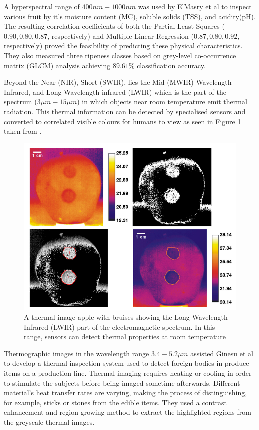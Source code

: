 \documentclass[fleqn,twoside,12pt]{report}
\begin{document}
A hyperspectral range of $400nm-1000nm$ was used by ElMasry et al \cite{elmasry2} to inspect various fruit by it's moisture content (MC), soluble solids (TSS), and acidity(pH). The resulting correlation coefficients of both the Partial Least Squares ($0.90, 0.80, 0.87$, respectively) and Multiple Linear Regression ($0.87, 0.80, 0.92$, respectively) proved the feasibility of predicting these physical characteristics. They also measured three ripeness classes based on grey-level co-occurrence matrix (GLCM) analysis achieving $89.61\%$ classification accuracy.


Beyond the Near (NIR), Short (SWIR), lies the Mid (MWIR) Wavelength Infrared, and  Long Wavelength infrared (LWIR) which is the part of the spectrum ($3\mu m-15\mu m$) in which objects near room temperature emit thermal radiation. This thermal information can be detected by specialised sensors and converted to correlated visible colours for humans to view as seen in Figure \ref{fig:thermal} taken from \cite{baranowski}.

\begin{figure}[h]
	\centering
	\includegraphics[width=0.8\linewidth]{thermal.png}
	\caption{A thermal image apple with bruises showing the Long Wavelength Infrared (LWIR) part of the electromagnetic spectrum. In this range, sensors can detect thermal properties at room temperature}
	\label{fig:thermal}
\end{figure}%


Thermographic images in the wavelength range $3.4-5.2\mu m$ assisted Ginesu et al \cite{ginesu} to develop a thermal inspection system used to detect foreign bodies in produce items on a production line. Thermal imaging requires heating or cooling in order to stimulate the subjects before being imaged sometime afterwards. Different material's heat transfer rates are varying, making the process of distinguishing, for example, sticks or stones from the edible items. They used a contrast enhancement and region-growing method to extract the highlighted regions from the greyscale thermal images.
\end{document}
